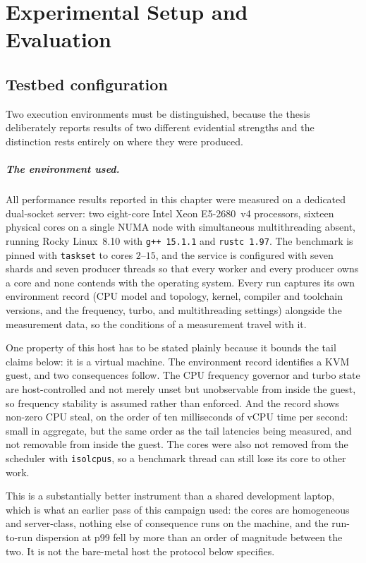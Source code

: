 \documentclass[english,twoside,openright,a4paper,censored,csm,software-track-2020]{HYthesisML}
\begin{document}
\chapter{Experimental Setup and Evaluation\label{chapter:eval}}

\section{Testbed configuration\label{sec:testbed}}
Two execution environments must be distinguished, because the thesis deliberately reports
results of two different evidential strengths and the distinction rests entirely on where
they were produced.

\paragraph{The environment used.}
All performance results reported in this chapter were measured on a dedicated dual-socket server:
two eight-core Intel Xeon E5-2680~v4 processors, sixteen physical cores on a single NUMA node with
simultaneous multithreading absent, running Rocky Linux~8.10 with \texttt{g++~15.1.1} and
\texttt{rustc~1.97}. The benchmark is pinned with \texttt{taskset} to cores $2$--$15$, and the
service is configured with seven shards and seven producer threads so that every worker and every
producer owns a core and none contends with the operating system. Every run captures its own
environment record (CPU model and topology, kernel, compiler and toolchain versions, and the
frequency, turbo, and multithreading settings) alongside the measurement data, so the conditions
of a measurement travel with it.

One property of this host has to be stated plainly because it bounds the tail claims below: it is
a virtual machine. The environment record identifies a KVM guest, and two consequences follow.
The CPU frequency governor and turbo state are host-controlled and not merely unset but
unobservable from inside the guest, so frequency stability is assumed rather than enforced. And
the record shows non-zero CPU steal, on the order of ten milliseconds of vCPU time per second:
small in aggregate, but the same order as the tail latencies being measured, and not removable
from inside the guest. The cores were also not removed from the scheduler with
\texttt{isolcpus}, so a benchmark thread can still lose its core to other work.

This is a substantially better instrument than a shared development laptop, which is what an
earlier pass of this campaign used: the cores are homogeneous and server-class, nothing else of
consequence runs on the machine, and the run-to-run dispersion at p99 fell by more than an order
of magnitude between the two. It is not the bare-metal host the protocol below specifies.
\end{document}
